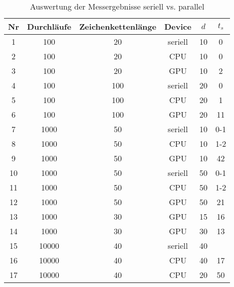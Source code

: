 \begin{table}[!h]
     \centering
    \begin{tabular}{cccccc}
      Nr & Durchläufe & Zeichenkettenlänge & Device & $d$ & $t_s$ \\
        \hline                                                     \hline
        1 & 100 & 20 & seriell  & 10 & 0 \\
        2 & 100 & 20 & CPU      & 10 & 0 \\
        3 & 100 & 20 & GPU      & 10 & 2 \\
        \hline
        4 & 100 & 100 & seriell  & 20 & 0  \\
        5 & 100 & 100 & CPU      & 20 & 1  \\
        6 & 100 & 100 & GPU      & 20 & 11 \\
        \hline
        7 & 1000 & 50 & seriell  & 10 & 0-1  \\
        8 & 1000 & 50 & CPU      & 10 & 1-2 \\
        9 & 1000 & 50 & GPU      & 10 & 42 \\
        \hline
        10 & 1000 & 50 & seriell  & 50 & 0-1 \\
        11 & 1000 & 50 & CPU      & 50 & 1-2 \\
        12 & 1000 & 50 & GPU      & 50 & 21 \\
        \hline
        13 & 1000 & 30 & GPU      & 15 & 16 \\
        14 & 1000 & 30 & GPU      & 30 & 13 \\
        \hline
        15 & 10000 & 40 & seriell & 40  \\
        16 & 10000 & 40 & CPU & 40 & 17 \\
        17 & 10000 & 40 & CPU & 20 & 50 \\


        \hline
    \end{tabular}
    \caption{Auswertung der Messergebnisse seriell vs. parallel}
    \label{tbl:results}
\end{table}
